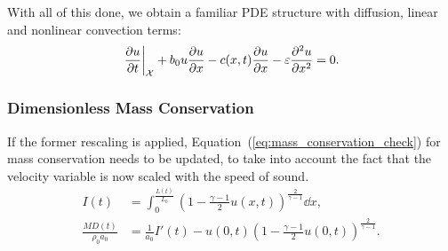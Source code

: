 \documentclass[../../thesis.tex]{subfiles}
\newcommand{\aleX}{\ensuremath{\mathcal{X}}}
\begin{document}
With all of this done, we obtain a familiar PDE structure with diffusion, 
linear and nonlinear convection terms:
\begin{equation}
    \left.\frac{\partial u}{\partial t}\right|_{\aleX} 
    + b_0 u \frac{\partial u}{\partial x} 
    - c(x,t)\frac{\partial u}{\partial x} 
    - \varepsilon  \pdv[2]{u}{x} = 0.
\end{equation}

\subsubsection{Dimensionless Mass Conservation}
If the former rescaling is applied, Equation~(\ref{eq:mass_conservation_check}) 
for mass conservation needs to be updated, 
to take into account the fact that the velocity variable is now scaled with the speed of sound.
\begin{subequations}
    \begin{align}
        I(t) &= \int_{0}^{\frac{L(t)}{L_0}} 
        \left(1 - \frac{\gamma-1}{2}u(x,t)\right)^{\frac{2}{\gamma-1}} 
        \dd x, 
        \\
        \frac{MD(t)}{\rho_0 a_0} &= \frac{1}{a_0}I'(t) - u(0,t) 
        \left(1 - \frac{\gamma-1}{2}u(0,t)\right)^{\frac{2}{\gamma-1}}.
    \end{align}    
\end{subequations}


\end{document}

